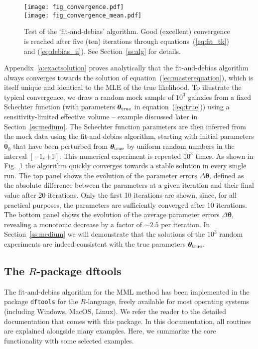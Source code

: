 \documentclass[a4paper,fleqn,usenatbib]{mnras}
\newcommand{\dftools}{\texttt{dftools}\xspace}
\newcommand{\fig}[1]{Fig.~\ref{fig:#1}}
\newcommand{\eq}[1]{equation~(\ref{eq:#1})}
\renewcommand{\ss}[1]{Section~\ref{ss:#1}}
\renewcommand{\a}[1]{Appendix~\ref{a:#1}}
\newcommand{\para}{{\bm{\theta}}}
\begin{document}
\begin{figure}
\begin{center}
\texttt{[image: fig\_convergence.pdf]}\vspace{0.4cm}\\
\texttt{[image: fig\_convergence\_mean.pdf]}\vspace{-0.4cm}
\caption{Test of the `fit-and-debias' algorithm. Good (excellent) convergence is reached after five (ten) iterations through equations~(\ref{eq:fit_tk}) and (\ref{eq:debias_n}). See \ss{alg} for details.}\label{fig:convergence}
\end{center}
\end{figure}

\a{exactsolution} proves analytically that the fit-and-debias algorithm always converges towards the solution of \eq{masterequation}, which is itself unique and identical to the MLE of the true likelihood. To illustrate the typical convergence, we draw a random mock sample of $10^3$ galaxies from a fixed Schechter function (with parameters $\para_{\rm true}$ in \eq{true}) using a sensitivity-limited effective volume -- example discussed later in \ss{medium}. The Schechter function parameters are then inferred from the mock data using the fit-and-debias algorithm, starting with initial parameters $\hat\para_0$ that have been perturbed from $\para_{\rm true}$ by uniform random numbers in the interval $[-1,+1]$. This numerical experiment is repeated $10^3$ times. As shown in \fig{convergence} the algorithm quickly converges towards a stable solution in every single run. The top panel shows the evolution of the parameter errors $\Delta\para$, defined as the absolute difference between the parameters at a given iteration and their final value after 20 iterations. Only the first 10 iterations are shown, since, for all practical purposes, the parameters are sufficiently converged after 10 iterations. The bottom panel shows the evolution of the average parameter errors $\Delta\para$, revealing a monotonic decrease by a factor of $\sim2.5$ per iteration. In \ss{medium} we will demonstrate that the solutions of the $10^3$ random experiments are indeed consistent with the true parameters $\para_{\rm true}$.

\subsection{The $R$-package dftools}\label{ss:package}

The fit-and-debias algorithm for the MML method has been implemented in the package \dftools for the $R$-language, freely available for most operating systems (including Windows, MacOS, Linux). We refer the reader to the detailed documentation that comes with this package. In this documentation, all routines are explained alongside many examples. Here, we summarize the core functionality with some selected examples.
\end{document}
